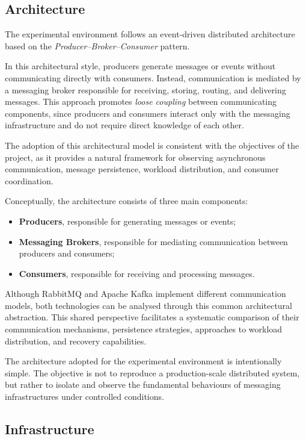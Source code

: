 \documentclass{scrartcl}
\begin{document}
\subsection{Architecture}

The experimental environment follows an event-driven distributed architecture based on the \emph{Producer--Broker--Consumer} pattern.

In this architectural style, producers generate messages or events without communicating directly with consumers. Instead, communication is mediated by a messaging broker responsible for receiving, storing, routing, and delivering messages. This approach promotes \emph{loose coupling} between communicating components, since producers and consumers interact only with the messaging infrastructure and do not require direct knowledge of each other.

The adoption of this architectural model is consistent with the objectives of the project, as it provides a natural framework for observing asynchronous communication, message persistence, workload distribution, and consumer coordination.

Conceptually, the architecture consists of three main components:

\begin{itemize}
\item \textbf{Producers}, responsible for generating messages or events;
\item \textbf{Messaging Brokers}, responsible for mediating communication between producers and consumers;
\item \textbf{Consumers}, responsible for receiving and processing messages.
\end{itemize}

Although RabbitMQ and Apache Kafka implement different communication models, both technologies can be analysed through this common architectural abstraction. This shared perspective facilitates a systematic comparison of their communication mechanisms, persistence strategies, approaches to workload distribution, and recovery capabilities.

The architecture adopted for the experimental environment is intentionally simple. The objective is not to reproduce a production-scale distributed system, but rather to isolate and observe the fundamental behaviours of messaging infrastructures under controlled conditions. 


\subsection{Infrastructure}\label{infrastructure}
\end{document}
